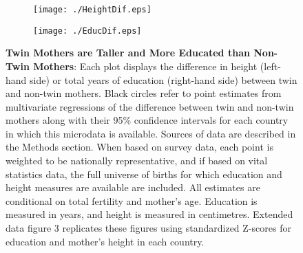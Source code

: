\documentclass{nature}
\begin{document}
\begin{linenumbers}
\begin{spacing}{1}
\begin{figure}[htpb!]
\begin{subfigure}{.5\textwidth}
  \texttt{[image: ./HeightDif.eps]}
\end{subfigure}%
\begin{subfigure}{.5\textwidth}
  \texttt{[image: ./EducDif.eps]}
\end{subfigure}
\vspace{5mm}
\caption{\textbf{Twin Mothers are Taller and More Educated than Non-Twin Mothers}: {\footnotesize Each plot displays the difference in height (left-hand side) or total years of education (right-hand side) between twin and non-twin mothers.  Black circles refer to point estimates from multivariate regressions of the difference between twin and non-twin mothers along with their 95\% confidence intervals for each country in which this microdata is available.  Sources of data are described in the Methods section.  When based on survey data, each point is weighted to be nationally representative, and if based on vital statistics data, the full universe of births for which education and height measures are available are included.  All estimates are conditional on total fertility and mother's age. Education is measured in years, and height is measured in centimetres.  Extended data figure 3 replicates these figures using standardized Z-scores for education and mother's height in each country.}}
\label{fig:countryEsts}
\end{figure}



\end{spacing}
\end{linenumbers}
\end{document}
